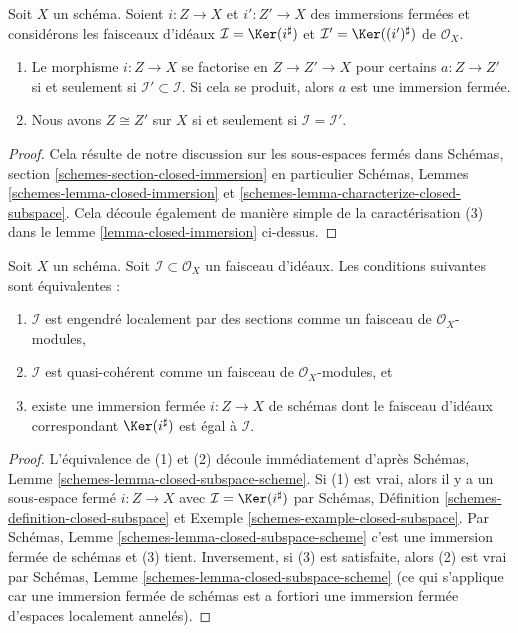\begin{lemma}
\label{lemma-closed-immersion-ideals}
Soit $X$ un schéma. Soient $i : Z \to X$ et
$i' : Z' \to X$ des immersions fermées et considérons
les faisceaux d'idéaux $\mathcal{I} = \Ker(i^\sharp)$ et $\mathcal{I}' = \Ker((i')^\sharp)$
de $\mathcal{O}_X$.
\begin{enumerate}
\item Le morphisme $i : Z \to X$ se factorise en $Z \to Z' \to X$ pour
certains $a : Z \to Z'$ si et seulement si $\mathcal{I}' \subset \mathcal{I}$. Si cela se produit,
alors $a$ est une immersion fermée.
\item Nous avons $Z \cong Z'$ sur $X$ si et
seulement si $\mathcal{I} = \mathcal{I}'$.
\end{enumerate}
\end{lemma}

\begin{proof}
Cela résulte de notre discussion sur les sous-espaces
fermés dans Schémas, section \ref{schemes-section-closed-immersion}
en particulier
Schémas, Lemmes \ref{schemes-lemma-closed-immersion}
et \ref{schemes-lemma-characterize-closed-subspace}. Cela découle également
de manière simple de la caractérisation (3)
dans le lemme \ref{lemma-closed-immersion} ci-dessus.
\end{proof}

\begin{lemma}
\label{lemma-closed-immersion-bijection-ideals}
Soit $X$ un schéma.
Soit $\mathcal{I} \subset \mathcal{O}_X$ un faisceau d'idéaux. Les conditions suivantes
sont équivalentes :
\begin{enumerate}
\item $\mathcal{I}$ est engendré localement par des
sections comme un faisceau de $\mathcal{O}_X$-modules,
\item $\mathcal{I}$ est quasi-cohérent comme
un faisceau de $\mathcal{O}_X$-modules, et
\item existe une immersion fermée $i : Z \to X$ de schémas dont le
faisceau d'idéaux correspondant $\Ker(i^\sharp)$ est égal à $\mathcal{I}$.
\end{enumerate}
\end{lemma}

\begin{proof}
L'équivalence de (1) et (2) découle immédiatement
d'après Schémas, Lemme \ref{schemes-lemma-closed-subspace-scheme}.
Si (1) est vrai, alors il y a un sous-espace fermé
$i : Z \to X$ avec $\mathcal{I} = \Ker(i^\sharp)$
par Schémas, Définition \ref{schemes-definition-closed-subspace} et Exemple \ref{schemes-example-closed-subspace}.
Par Schémas, Lemme \ref{schemes-lemma-closed-subspace-scheme}
c'est une immersion fermée de schémas et (3) tient.
Inversement, si (3) est satisfaite, alors
(2) est vrai par Schémas, Lemme
\ref{schemes-lemma-closed-subspace-scheme} (ce qui s'applique car une immersion
fermée de schémas est a fortiori une immersion fermée
d'espaces localement annelés).
\end{proof}

